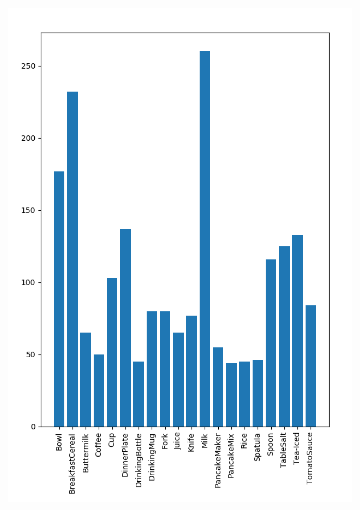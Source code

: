 \begin{figure}
\centering
	\begin{subfigure}[b]{0.4\textwidth}
	\centering
		\includegraphics[scale=.4]{img/chapter6/UnrealGTClass_analysis.png}
	\end{subfigure}
	\begin{subfigure}[b]{0.58\textwidth}
	\centering

\end{subfigure}
\end{figure}
